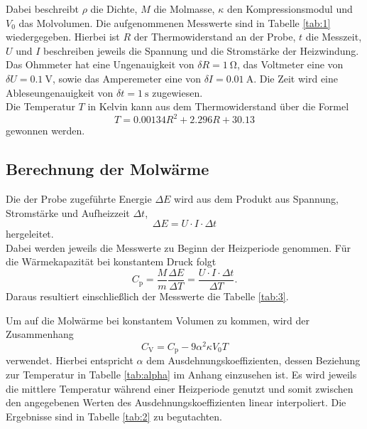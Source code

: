 Dabei beschreibt $\rho$ die Dichte, $M$ die Molmasse, $\kappa$ den Kompressionsmodul und $V_0$ das Molvolumen.
Die aufgenommenen Messwerte sind in Tabelle \ref{tab:1} wiedergegeben.
Hierbei ist $R$ der Thermowiderstand an der Probe, $t$ die Messzeit, $U$ und $I$ beschreiben jeweils die Spannung und die Stromstärke der Heizwindung.
Das Ohmmeter hat eine Ungenauigkeit von $\delta R = \SI{1}{\ohm}$, das Voltmeter eine von $\delta U = \SI{0.1}{\volt}$, sowie das Amperemeter eine von $\delta I = \SI{0.01}{\ampere}$.
Die Zeit wird eine Ableseungenauigkeit von $\delta t = \SI{1}{\second}$ zugewiesen.\\
Die Temperatur $T$ in Kelvin kann aus dem Thermowiderstand über die Formel
\begin{equation}
  T = 0.00134R^2+2.296R+30.13
\end{equation}
gewonnen werden.


\newpage

\subsection{Berechnung der Molwärme}
Die der Probe zugeführte Energie $\Delta E$ wird aus dem Produkt aus Spannung, Stromstärke und Aufheizzeit $\Delta t$,
\begin{equation}
  \Delta E =  U\cdot I\cdot \Delta t
\end{equation}
hergeleitet.\\
Dabei werden jeweils die Messwerte zu Beginn der Heizperiode genommen.
Für die Wärmekapazität bei konstantem Druck folgt
\begin{equation}
  C_{\text{p}} = \frac{M}{m}\frac{\Delta E}{\Delta T} = \frac{U\cdot I\cdot \Delta t}{\Delta T}.
\end{equation}
Daraus resultiert einschließlich der Messwerte die Tabelle \ref{tab:3}.



Um auf die Molwärme bei konstantem Volumen zu kommen, wird der Zusammenhang
\begin{equation}
  C_{\text{V}} = C_{\text{p}} - 9 \alpha^2 \kappa V_0 T
\end{equation}
verwendet.
Hierbei entspricht $\alpha$ dem Ausdehnungskoeffizienten, dessen Beziehung zur Temperatur in Tabelle \ref{tab:alpha} im Anhang einzusehen ist.
Es wird jeweils die mittlere Temperatur während einer Heizperiode genutzt und somit zwischen den angegebenen Werten des Ausdehnungskoeffizienten linear interpoliert.
Die Ergebnisse sind in Tabelle \ref{tab:2} zu begutachten.

